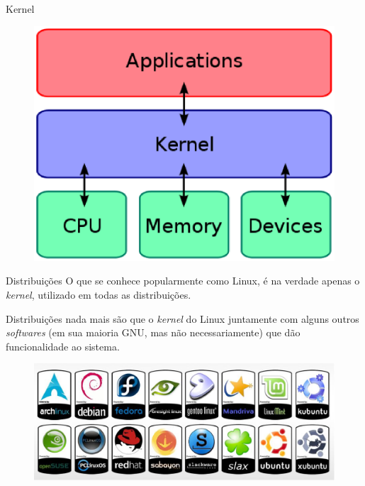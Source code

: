 \documentclass[size=14pt,
style=paintings
]{powerdot}
\newenvironment{vslide}{\vspace{\stretch{1}}}{\vspace{\stretch{1}}}
\begin{document}
\begin{slide}{Kernel}


   \begin{figure}[!h]
  \includegraphics[scale=.8]{imagens/slide/kernel1}
   \end{figure}

\end{slide}

\begin{slide}{Distribuições}
\begin{vslide}
O que se conhece popularmente como Linux, é na verdade apenas o \textit{kernel}, utilizado em todas as distribuições.

\vspace{0.5cm}
Distribuições nada mais são que o \textit{kernel} do Linux juntamente com alguns outros \textit{softwares} (em sua maioria GNU, mas não necessariamente) que dão funcionalidade ao sistema.

   \begin{figure}[!h]
  \includegraphics[scale=0.4]{imagens/slide/distro}
   \end{figure}
\end{vslide}
\end{slide}
\end{document}
